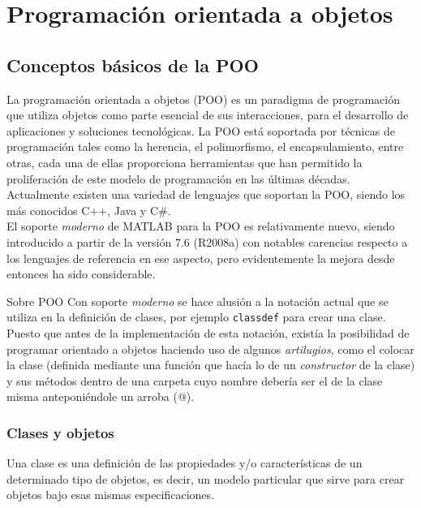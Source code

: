 \chapter{Programación orientada a objetos}

\section{Conceptos básicos de la POO}

La programación orientada a objetos (POO) es un paradigma de
programación que utiliza objetos como parte esencial de sus
interacciones, para el desarrollo de aplicaciones y soluciones
tecnológicas. La POO está soportada por técnicas de programación tales
como la herencia, el polimorfismo, el encapsulamiento, entre otras, cada
una de ellas proporciona herramientas que han permitido la proliferación
de este modelo de programación en las últimas décadas. Actualmente
existen una variedad de lenguajes que soportan la POO, siendo los más
conocidos C++, Java y C\#. \\

El soporte \emph{moderno} de MATLAB para la POO es relativamente nuevo,
siendo introducido a partir de la versión 7.6 (R2008a) con notables
carencias respecto a los lenguajes de referencia en ese aspecto, pero
evidentemente la mejora desde entonces ha sido considerable. \\

\begin{informacion}{Sobre POO}
Con soporte \emph{moderno} se hace alusión a la notación
actual que se  utiliza en la definición de clases, por
ejemplo \texttt{classdef} para crear  una clase. Puesto
que antes de la implementación de esta notación,  existía
la posibilidad de programar orientado a objetos haciendo uso
 de algunos \emph{artilugios}, como el colocar la clase
(definida mediante  una función que hacía lo de un
\emph{constructor} de la clase) y sus  métodos dentro de
una carpeta cuyo nombre debería ser el de la clase  misma
anteponiéndole un arroba (@).
\end{informacion}

\subsection{Clases y objetos}

Una clase es una definición de las propiedades y/o características de un
determinado tipo de objetos, es decir, un modelo particular que sirve
para crear objetos bajo esas mismas especificaciones. \\

